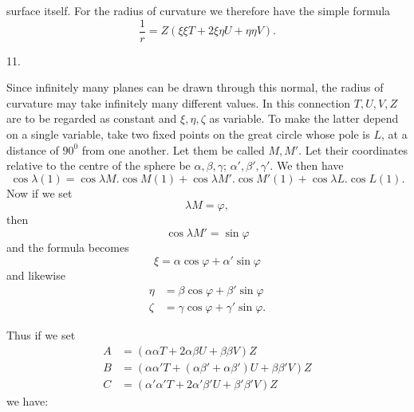 %
surface itself. For the radius of curvature we therefore have the simple formula
\[
\frac1r=Z(\xi\xi T+2\xi\eta U+\eta\eta V).
\]

\begin{center}11.\end{center}
\noindent\hspace*{1.2em}Since infinitely many planes can be drawn through this normal, the radius of curvature may take infinitely many different values. In this connection $T,U,V,Z$ are to be regarded as constant and $\xi,\eta,\zeta$ as variable. To make the latter depend on a single variable, take two fixed points on the great circle whose pole is $L$, at a distance of $90^{0}$ from one another. Let them be called $M,M'$. Let their coordinates relative to the centre of the sphere be $\alpha,\beta,\gamma$; $\alpha',\beta',\gamma'$. We then have
\[
\cos\lambda(1)=\cos\lambda M.\cos M(1)+\cos\lambda M'.\cos M'(1)+\cos\lambda L.\cos L(1).
\]
Now if we set
\[
\lambda M=\varphi,
\]
then
\[
\cos\lambda M'=\sin\varphi
\]
and the formula becomes
\[
\xi=\alpha\cos\varphi+\alpha'\sin\varphi
\]
and likewise
\[
\begin{aligned}
\eta&=\beta\cos\varphi+\beta'\sin\varphi\\
\zeta&=\gamma\cos\varphi+\gamma'\sin\varphi.
\end{aligned}
\]

Thus if we set
\[
\begin{aligned}
A&=(\alpha\alpha T+2\alpha\beta U+\beta\beta V)Z\\
B&=(\alpha\alpha'T+(\alpha\beta'+\alpha\beta')U+\beta\beta'V)Z\\
C&=(\alpha'\alpha'T+2\alpha'\beta'U+\beta'\beta'V)Z
\end{aligned}
\]
we have:
